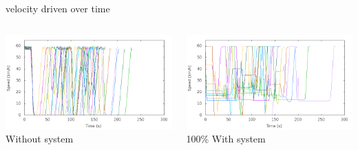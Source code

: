 \begin{frame}{velocity driven over time}
\begin{columns}
	\begin{column}{0.5\textwidth}
	\includegraphics[width=1\textwidth]{images/tp0/speed0.png}\\
	Without system
	\end{column}
	\begin{column}{0.5\textwidth}
	\includegraphics[width=1\textwidth]{images/tp0/speed100.png}\\
	100\% With system
	\end{column}
\end{columns}
\end{frame}